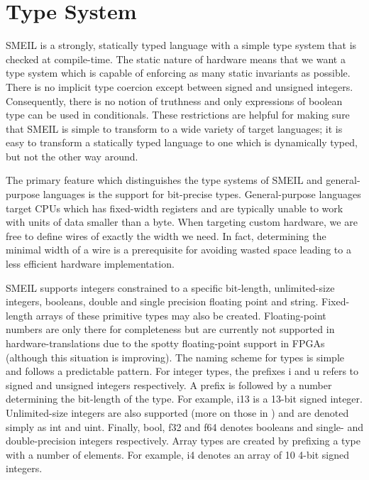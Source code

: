 
\section{Type System}
\label{sec:typesys}
SMEIL is a strongly, statically typed language with a simple type system that is
checked at compile-time. The static nature of hardware means that we want a
type system which is capable of enforcing as many static invariants as
possible. There is no implicit type coercion except between signed and unsigned
integers.  Consequently, there is no notion of truthness and only expressions of
boolean type can be used in conditionals. These restrictions are helpful for
making sure that SMEIL is simple to transform to a wide variety of target
languages; it is easy to transform a statically typed language to one which is
dynamically typed, but not the other way around.

The primary feature which distinguishes the type systems of SMEIL and
general-purpose languages is the support for bit-precise types. General-purpose
languages target CPUs which has fixed-width registers and are typically unable
to work with units of data smaller than a byte. When targeting custom hardware,
we are free to define wires of exactly the width we need. In fact, determining
the minimal width of a wire is a prerequisite for avoiding wasted space leading
to a less efficient hardware implementation.

SMEIL supports integers constrained to a specific bit-length, unlimited-size
integers, booleans, double and single precision floating point and
string. Fixed-length arrays of these primitive types may also be
created. Floating-point numbers are only there for completeness but are
currently not supported in hardware-translations due to the spotty
floating-point support in FPGAs (although this situation is improving). The
naming scheme for types is simple and follows a predictable pattern. For integer
types, the prefixes {\ttfamily i} and {\ttfamily u} refers to signed and
unsigned integers respectively. A prefix is followed by a number determining the
bit-length of the type. For example, {\ttfamily i13} is a 13-bit signed
integer. Unlimited-size integers are also supported (more on those in
) and are denoted simply as {\ttfamily int} and {\ttfamily
  uint}. Finally, {\ttfamily bool}, {\ttfamily f32} and {\ttfamily f64} denotes
booleans and single- and double-precision integers respectively. Array types are
created by prefixing a type with a number of elements. For example, {\ttfamily
  [10]i4} denotes an array of 10 4-bit signed integers.

